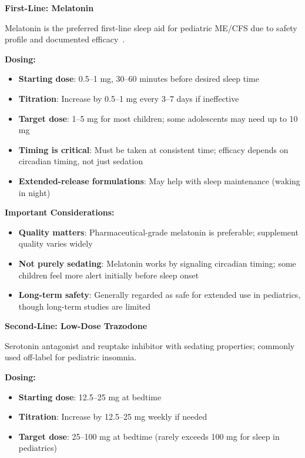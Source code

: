 \begin{protocol}
\label{protocol:ped-sleep}

\textbf{First-Line: Melatonin}

Melatonin is the preferred first-line sleep aid for pediatric ME/CFS due to safety profile and documented efficacy~\cite{castromarrero2021melatonin}.

\textbf{Dosing:}
\begin{itemize}
    \item \textbf{Starting dose}: 0.5--1 mg, 30--60 minutes before desired sleep time
    \item \textbf{Titration}: Increase by 0.5--1 mg every 3--7 days if ineffective
    \item \textbf{Target dose}: 1--5 mg for most children; some adolescents may need up to 10 mg
    \item \textbf{Timing is critical}: Must be taken at consistent time; efficacy depends on circadian timing, not just sedation
    \item \textbf{Extended-release formulations}: May help with sleep maintenance (waking in night)
\end{itemize}

\textbf{Important Considerations:}
\begin{itemize}
    \item \textbf{Quality matters}: Pharmaceutical-grade melatonin is preferable; supplement quality varies widely
    \item \textbf{Not purely sedating}: Melatonin works by signaling circadian timing; some children feel more alert initially before sleep onset
    \item \textbf{Long-term safety}: Generally regarded as safe for extended use in pediatrics, though long-term studies are limited
\end{itemize}

\textbf{Second-Line: Low-Dose Trazodone}

Serotonin antagonist and reuptake inhibitor with sedating properties; commonly used off-label for pediatric insomnia.

\textbf{Dosing:}
\begin{itemize}
    \item \textbf{Starting dose}: 12.5--25 mg at bedtime
    \item \textbf{Titration}: Increase by 12.5--25 mg weekly if needed
    \item \textbf{Target dose}: 25--100 mg at bedtime (rarely exceeds 100 mg for sleep in pediatrics)
\end{itemize}


\end{protocol}
